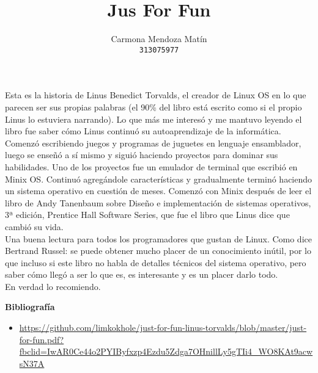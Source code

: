 \documentclass[11pt, a4paper]{report}
\begin{document}
\title{Jus For Fun}
\author{
  Carmona Mendoza Mat\'in\\
  \texttt{313075977}
}
\date{}
\maketitle

Esta es la historia de Linus Benedict Torvalds, el creador de Linux OS en lo
que parecen ser sus propias palabras (el 90\% del libro está escrito como si el
propio Linus lo estuviera narrando). Lo que más me interesó y me mantuvo
leyendo el libro fue saber cómo Linus continuó su autoaprendizaje de la
informática. Comenzó escribiendo juegos y programas de juguetes en lenguaje
ensamblador, luego se enseñó a sí mismo y siguió haciendo proyectos para
dominar sus habilidades. Uno de los proyectos fue un emulador de terminal que
escribió en Minix OS. Continuó agregándole características y gradualmente
terminó haciendo un sistema operativo en cuestión de meses. Comenzó con Minix
después de leer el libro de Andy Tanenbaum sobre Diseño e implementación de
sistemas operativos, 3ª edición, Prentice Hall Software Series, que fue el
libro que Linus dice que cambió su vida. \\

Una buena lectura para todos los programadores que gustan de Linux. Como dice
Bertrand Russel: se puede obtener mucho placer de un conocimiento inútil, por
lo que incluso si este libro no habla de detalles técnicos del sistema
operativo, pero saber cómo llegó a ser lo que es, es interesante y es un placer
darlo todo. \\

En verdad lo recomiendo.


\newpage

\textbf{Bibliografía} \\

\begin{itemize}

\item \url{https://github.com/limkokhole/just-for-fun-linus-torvalds/blob/master/just-for-fun.pdf?fbclid=IwAR0Ce44o2PYIByfxzp4Ezdu5Zdga7OHnillLy5gTIi4_WO8KAt9acwsN37A}


\end{itemize}
\end{document}
